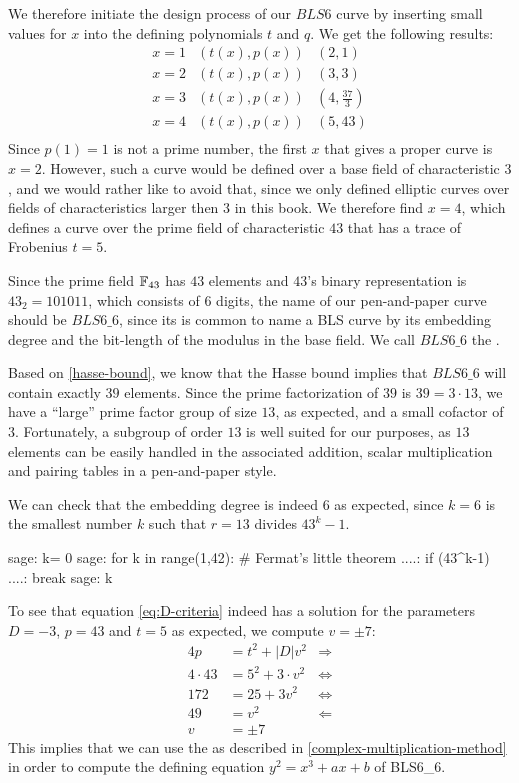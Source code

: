 We therefore initiate the design process of our $BLS6$ curve by inserting small values for $x$ into the defining polynomials $t$ and $q$. We get the following results:
$$
\begin{array}{lcr}
x=1 & (t(x),p(x)) & (2,1)\\
x=2 & (t(x),p(x)) & (3,3)\\
x=3 & (t(x),p(x)) & (4,\frac{37}{3})\\
x=4 & (t(x),p(x)) & (5,43)\\
\end{array}
$$
Since $p(1)=1$ is not a prime number, the first $x$ that gives a proper curve is $x=2$. However, such a curve would be defined over a base field of characteristic $3$, and we would rather like to avoid that, since we only defined elliptic curves over fields of characteristics larger then $3$ in this book. We therefore find $x=4$, which defines a curve over the prime field of characteristic $43$ that has a trace of Frobenius $t=5$. 

Since the prime field $\mathbb{F}_{43}$ has $43$ elements and $43$'s binary representation is $43_2= 101011$, which consists of $6$ digits, the name of our pen-and-paper curve should be $BLS6\_6$, since its is common to name a BLS curve by its embedding degree and the bit-length of the modulus in the base field. We call $BLS6\_6$ the .

Based on \ref{hasse-bound}, we know that the Hasse bound implies that $BLS6\_6$ will contain exactly $39$ elements. Since the prime factorization of $39$ is $39=3\cdot 13$, we have a ``large'' prime factor group of size $13$, as expected, and a small cofactor of $3$. Fortunately, a subgroup of order $13$ is well suited for our purposes, as $13$ elements can be easily handled in the associated addition, scalar multiplication and pairing tables in a pen-and-paper style. 

We can check that the embedding degree is indeed $6$ as expected, since $k = 6$ is the smallest number $k$ such that $r=13$ divides $43^k-1$. 
\begin{sagecommandline}
sage: k= 0
sage: for k in range(1,42): # Fermat's little theorem
....:     if (43^k-1)%
....:         break
sage: k
\end{sagecommandline}

To see that equation \ref{eq:D-criteria} indeed has a solution for the parameters $D=-3$, $p=43$ and $t=5$ as expected, we compute $v=\pm 7$:  
\begin{align*}
4p & = t^2 + |D|v^2 & \Rightarrow \\ 
4\cdot 43 & = 5^2 + 3\cdot v^2 & \Leftrightarrow \\ 
172 & = 25 + 3 v^2 & \Leftrightarrow \\ 
49 & = v^2 & \Leftarrow \\
v & = \pm 7
\end{align*}
This implies that we can use the  as described in \ref{complex-multiplication-method} in order to compute the defining equation $y^2=x^3 + ax + b$ of BLS6\_6. 

